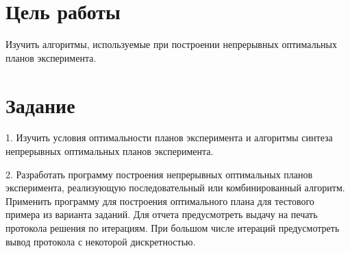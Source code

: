 ﻿%

\newcommand{\insertFourImages}[4]
{
	\begin{figure}[!htb] %
		\centering
		\texttt{[image: ../pics/plan\#1.png]}
		\texttt{[image: ../pics/plan\#2.png]}
		\texttt{[image: ../pics/plan\#3.png]}
		\texttt{[image: ../pics/plan\#4.png]}
	\end{figure}
}


\newcommand{\insertTable}[1]
{
	s = #1

	

	\vspace{8mm}
}





\section{Цель работы}
Изучить алгоритмы, используемые при построении непрерывных оптимальных планов эксперимента.


\section{Задание}

1.	Изучить условия оптимальности планов эксперимента и алгоритмы синтеза непрерывных оптимальных планов эксперимента.

2.	Разработать программу построения непрерывных оптимальных планов эксперимента, реализующую последовательный или комбинированный алгоритм. Применить программу для построения оптимального плана для тестового примера из варианта заданий. Для отчета предусмотреть выдачу на печать протокола решения по итерациям. При большом числе итераций предусмотреть вывод протокола с некоторой дискретностью.

